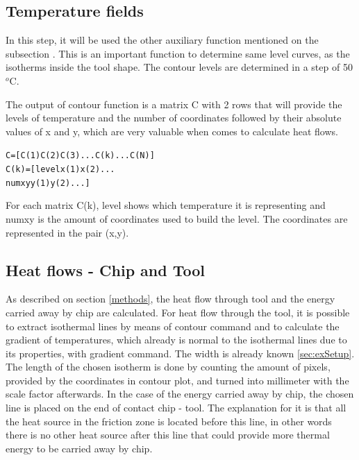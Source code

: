 	\subsection{Temperature fields}

	In this step, it will be used the other auxiliary function mentioned on the subsection . This is an important function to determine same level curves, as the isotherms inside the tool shape. The contour levels are determined in a step of 50 $^{o}$C.

	
	

	The output of contour function is a matrix C with 2 rows that will provide the levels of temperature and the number of coordinates followed by their absolute values of x and y, which are very valuable when comes to calculate heat flows.

		\begin{mdframed}[backgroundcolor=lightgray!25!]
		\begin{alltt}\fontsize{9pt}{8pt}\selectfont
		C    =  [C(1) C(2) C(3) ...C(k)... C(N)]
		C(k) =  [level x(1) x(2)...
		         numxy y(1) y(2)...]
		\end{alltt}
		\end{mdframed}
	
	For each matrix C(k), level shows which temperature it is representing and numxy is the amount of coordinates used to build the level. The coordinates are represented in the pair (x,y).

	\subsection{Heat flows - Chip and Tool}
	\label{heatflows}
	As described on section \ref{methods}, the heat flow through tool and the energy carried away by chip are calculated. For heat flow through the tool, it is possible to extract isothermal lines by means of contour command and to calculate the gradient of temperatures, which already is normal to the isothermal lines due to its properties, with gradient command. The width is already known \ref{sec:exSetup}. The length of the chosen isotherm is done by counting the amount of pixels, provided by the coordinates in contour plot, and turned into millimeter with the scale factor afterwards.
	In the case of the energy carried away by chip, the chosen line is placed on the end of contact chip - tool. The explanation for it is that all the heat source in the friction zone is located before this line, in other words there is no other heat source after this line that could provide more thermal energy to be carried away by chip.		

